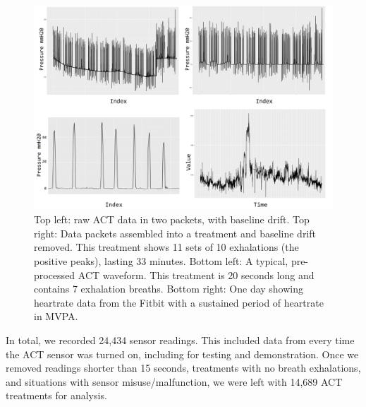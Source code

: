 \documentclass{article}
\begin{document}
\begin{figure}[htb]
  \includegraphics[width=\textwidth]{Waveforms.png}
  \centering
   \caption{Top left: raw ACT data in two packets, with baseline drift. Top right: Data packets assembled into a treatment and baseline drift removed. This treatment shows 11 sets of 10 exhalations (the positive peaks), lasting 33 minutes. Bottom left: A typical, pre-processed ACT waveform. This treatment is 20 seconds long and contains 7 exhalation breaths. Bottom right: One day showing heartrate data from the Fitbit with a sustained period of heartrate in MVPA.}
  \label{fig: Waveforms}
\end{figure}

In total, we recorded 24,434 sensor readings. This included data from every time the ACT sensor was turned on, including for testing and demonstration. Once we removed readings shorter than 15 seconds, treatments with no breath exhalations, and situations with sensor misuse/malfunction, we were left with 14,689 ACT treatments for analysis. 
\end{document}
